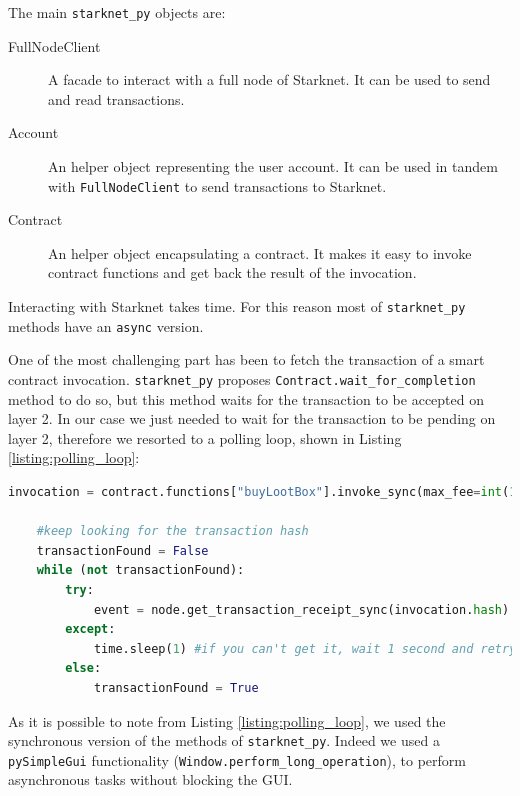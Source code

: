 \documentclass[12pt]{article}
\begin{document}
The main \verb|starknet_py| objects are:
\begin{description}
    \item[FullNodeClient] A facade to interact with a full node of Starknet. It can be used to send and read transactions.
    \item[Account] An helper object representing the user account. It can be used in tandem with \verb|FullNodeClient| to send transactions to Starknet.
    \item[Contract] An helper object encapsulating a contract. It makes it easy to invoke contract functions and get back the result of the invocation.
\end{description}

Interacting with Starknet takes time. For this reason most of \verb|starknet_py| methods have an \verb|async| version.

One of the most challenging part has been to fetch the transaction of a smart contract invocation. \verb|starknet_py| proposes \verb|Contract.wait_for_completion| method to do so, but this method waits for the transaction to be accepted on layer 2. 
In our case we just needed to wait for the transaction to be pending on layer 2, therefore we resorted to a polling loop, shown in Listing \ref{listing:polling_loop}:
\begin{lstlisting}[language=python, style=python3, label=listing:polling_loop, caption={Polling loop.}, captionpos=b]
    invocation = contract.functions["buyLootBox"].invoke_sync(max_fee=int(1e15))
    
    #keep looking for the transaction hash
    transactionFound = False
    while (not transactionFound):
        try:
            event = node.get_transaction_receipt_sync(invocation.hash).events[0] #try to get the transaction from the node
        except:
            time.sleep(1) #if you can't get it, wait 1 second and retry
        else:
            transactionFound = True
\end{lstlisting}

As it is possible to note from Listing \ref{listing:polling_loop}, we used the synchronous version of the methods of \verb|starknet_py|. Indeed we used a \verb|pySimpleGui| functionality (\verb|Window.perform_long_operation|), to perform asynchronous tasks without blocking the GUI.
\end{document}
